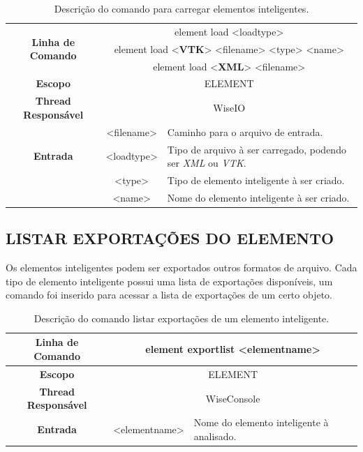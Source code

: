 \documentclass[a4paper,12pt]{monografia}
\theoremstyle{plain}
\theoremstyle{definition}
\theoremstyle{remark}
\begin{document}
\begin{center}
\begin{table}[!htbp]
	\begin{tabular}{|c|c|m{}|}
		\hline
		\multirow{3}{*}{\textbf{Linha de Comando}} & \multicolumn{2}{c|}{element load <load\underline{\space\space}type>} \\
		& \multicolumn{2}{c|}{element load <\textbf{VTK}> <filename> <type> <name>} \\
		& \multicolumn{2}{c|}{element load <\textbf{XML}> <filename>} \\
		\hline
		\textbf{Escopo} & \multicolumn{2}{c|}{ELEMENT} \\
		\hline
		\textbf{Thread Responsável} & \multicolumn{2}{c|}{WiseIO} \\
		\hline
		\multirow{3}{*}{\textbf{Entrada}} & <filename> & Caminho para o arquivo de entrada. \\
		& <load\underline{\space\space}type> & Tipo de arquivo à ser carregado, podendo ser \textit{XML} ou \textit{VTK}. \\
		& <type> & Tipo de elemento inteligente à ser criado. \\
		& <name> & Nome do elemento inteligente à ser criado. \\
		\hline
	\end{tabular}
	\caption{Descrição do comando para carregar elementos inteligentes.}
	\label{tab:load_element}
\end{table}
\end{center}

\subsection{LISTAR EXPORTAÇÕES DO ELEMENTO}\label{sec:export_list_element}

Os elementos inteligentes podem ser exportados outros formatos de arquivo. Cada tipo de elemento inteligente possui uma lista de exportações disponíveis, um comando foi inserido para acessar a lista de exportações de um certo objeto.

\begin{center}
\begin{table}[!htbp]
	\begin{tabular}{|c|c|m{}|}
		\hline
		\textbf{Linha de Comando} & \multicolumn{2}{c|}{element export\underline{\space\space}list <element\underline{\space\space}name>}  \\
		\hline
		\textbf{Escopo} & \multicolumn{2}{c|}{ELEMENT} \\
		\hline
		\textbf{Thread Responsável} & \multicolumn{2}{c|}{WiseConsole} \\
		\hline
		\textbf{Entrada} & <element\underline{\space\space}name> & Nome do elemento inteligente à analisado. \\
		\hline
	\end{tabular}
	\caption{Descrição do comando listar exportações de um elemento inteligente.}
	\label{tab:export_list_element}
\end{table}
\end{center}
\end{document}
